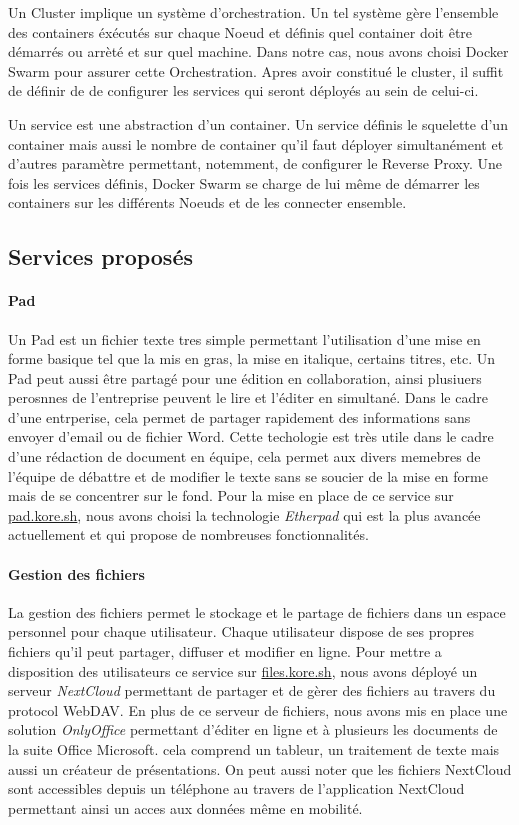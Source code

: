 Un Cluster implique un système d'orchestration.
Un tel système gère l'ensemble des containers éxécutés sur chaque Noeud et définis quel container doit être démarrés ou arrèté et sur quel machine.
Dans notre cas, nous avons choisi Docker Swarm pour assurer cette Orchestration.
Apres avoir constitué le cluster, il suffit de définir de de configurer les services qui seront déployés au sein de celui-ci.

Un service est une abstraction d'un container.
Un service définis le squelette d'un container mais aussi le nombre de container qu'il faut déployer simultanément et d'autres paramètre permettant, notemment, de configurer le Reverse Proxy.
Une fois les services définis, Docker Swarm se charge de lui même de démarrer les containers sur les différents Noeuds et de les connecter ensemble.

\subsection{Services proposés}

\paragraph{Pad} Un Pad est un fichier texte tres simple permettant l'utilisation d'une mise en forme basique tel que la mis en gras, la mise en italique, certains titres, etc.
Un Pad peut aussi être partagé pour une édition en collaboration, ainsi plusiuers perosnnes de l'entreprise peuvent le lire et l'éditer en simultané.
Dans le cadre d'une entrperise, cela permet de partager rapidement des informations sans envoyer d'email ou de fichier Word.
Cette techologie est très utile dans le cadre d'une rédaction de document en équipe, cela permet aux divers memebres de l'équipe de débattre et de modifier le texte sans se soucier de la mise en forme mais de se concentrer sur le fond.
Pour la mise en place de ce service sur \url{pad.kore.sh}, nous avons choisi la technologie \emph{Etherpad} qui est la plus avancée actuellement et qui propose de nombreuses fonctionnalités.

\paragraph{Gestion des fichiers} La gestion des fichiers permet le stockage et le partage de fichiers dans un espace personnel pour chaque utilisateur.
Chaque utilisateur dispose de ses propres fichiers qu'il peut partager, diffuser et modifier en ligne.
Pour mettre a disposition des utilisateurs ce service sur \url{files.kore.sh}, nous avons déployé un serveur \emph{NextCloud} permettant de partager et de gèrer des fichiers au travers du protocol WebDAV.
En plus de ce serveur de fichiers, nous avons mis en place une solution \emph{OnlyOffice} permettant d'éditer en ligne et à plusieurs les documents de la suite Office Microsoft.
cela comprend un tableur, un traitement de texte mais aussi un créateur de présentations.
On peut aussi noter que les fichiers NextCloud sont accessibles depuis un téléphone au travers de l'application NextCloud permettant ainsi un acces aux données même en mobilité.


